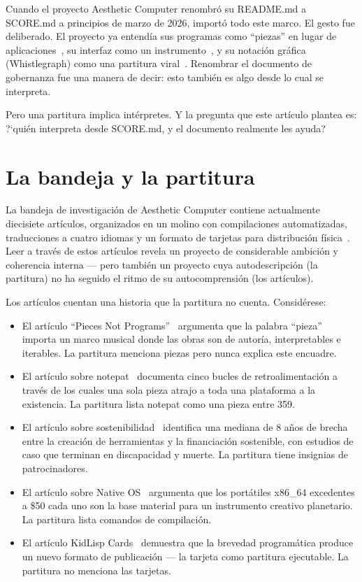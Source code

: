 \documentclass[10pt,letterpaper,twocolumn]{article}
\begin{document}
Cuando el proyecto Aesthetic Computer renombr\'o su README.md a SCORE.md a principios de marzo de 2026, import\'o todo este marco. El gesto fue deliberado. El proyecto ya entend\'ia sus programas como ``piezas'' en lugar de aplicaciones~\citep{scudder2026pieces}, su interfaz como un instrumento~\citep{scudder2026notepat}, y su notaci\'on gr\'afica (Whistlegraph) como una partitura viral~\citep{scudder2026whistlegraph}. Renombrar el documento de gobernanza fue una manera de decir: esto tambi\'en es algo desde lo cual se interpreta.

Pero una partitura implica int\'erpretes. Y la pregunta que este art\'iculo plantea es: ?`qui\'en interpreta desde SCORE.md, y el documento realmente les ayuda?

\section{La bandeja y la partitura}

La bandeja de investigaci\'on de Aesthetic Computer contiene actualmente diecisiete art\'iculos, organizados en un molino con compilaciones automatizadas, traducciones a cuatro idiomas y un formato de tarjetas para distribuci\'on f\'isica~\citep{scudder2026cards}. Leer a trav\'es de estos art\'iculos revela un proyecto de considerable ambici\'on y coherencia interna --- pero tambi\'en un proyecto cuya autodescripci\'on (la partitura) no ha seguido el ritmo de su autocomprensi\'on (los art\'iculos).

Los art\'iculos cuentan una historia que la partitura no cuenta. Consid\'erese:

\begin{itemize}
\item El art\'iculo ``Pieces Not Programs''~\citep{scudder2026pieces} argumenta que la palabra ``pieza'' importa un marco musical donde las obras son de autor\'ia, interpretables e iterables. La partitura menciona piezas pero nunca explica este encuadre.
\item El art\'iculo sobre notepat~\citep{scudder2026notepat} documenta cinco bucles de retroalimentaci\'on a trav\'es de los cuales una sola pieza atrajo a toda una plataforma a la existencia. La partitura lista notepat como una pieza entre 359.
\item El art\'iculo sobre sostenibilidad~\citep{scudder2026sustainability} identifica una mediana de 8 a\~nos de brecha entre la creaci\'on de herramientas y la financiaci\'on sostenible, con estudios de caso que terminan en discapacidad y muerte. La partitura tiene insignias de patrocinadores.
\item El art\'iculo sobre Native OS~\citep{scudder2026os} argumenta que los port\'atiles x86\_64 excedentes a \$50 cada uno son la base material para un instrumento creativo planetario. La partitura lista comandos de compilaci\'on.
\item El art\'iculo KidLisp Cards~\citep{scudder2026cards} demuestra que la brevedad program\'atica produce un nuevo formato de publicaci\'on --- la tarjeta como partitura ejecutable. La partitura no menciona las tarjetas.
\end{itemize}
\end{document}
